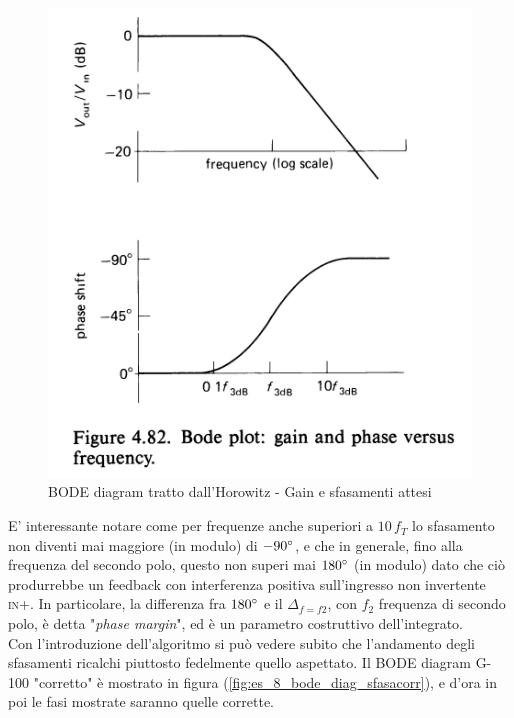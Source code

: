 \documentclass[journal, a4paper]{IEEEtran}
\begin{document}
\begin{figure}
\centering
\includegraphics[width=0.9\linewidth]{./horowitz_bode}
\caption{BODE diagram tratto dall'Horowitz - Gain e sfasamenti attesi}
\label{fig:horowitz_bode}
\end{figure}


E' interessante notare come per frequenze anche superiori a $10 \, f_T$ lo sfasamento non diventi mai maggiore (in modulo) di $-90 \degree$, e che in generale, fino alla frequenza del secondo polo, questo non superi mai $180 \degree$ (in modulo) dato che ciò produrrebbe un feedback con interferenza positiva sull'ingresso non invertente \textsc{in+}. In particolare, la differenza fra $180 \degree$ e il $\Delta _{f=f2}$, con $f_2$ frequenza di secondo polo, è detta "\textit{phase margin}", ed è un parametro costruttivo dell'integrato.\\

Con l'introduzione dell'algoritmo si può vedere subito che l'andamento degli sfasamenti ricalchi piuttosto fedelmente quello aspettato. Il BODE diagram G-100 "corretto" è mostrato in figura (\ref{fig:es_8_bode_diag_sfasacorr}), e d'ora in poi le fasi mostrate saranno quelle corrette.\\
 
\end{document}
